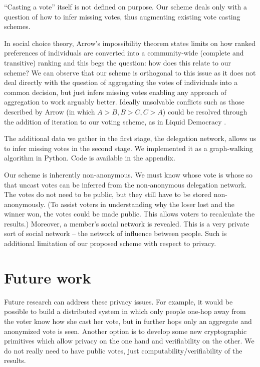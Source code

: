 \documentclass[a4paper]{acm_proc_article-sp}
\begin{document}
``Casting a vote'' itself is not defined on purpose.  Our scheme deals only with a question of how to infer missing votes, thus augmenting
existing vote casting schemes.

In social choice theory, Arrow's impossibility theorem\cite{arrow} states limits on how ranked preferences of individuals are
converted into a community-wide (complete and transitive) ranking and this begs the question: how does this relate to our
scheme? We can observe that our scheme is orthogonal to this issue as it does not deal directly with the question of aggregating
the votes of individuals into a common decision, but just infers missing votes enabling any approach of aggregation to work
arguably better.  Ideally unsolvable conflicts such as those described by Arrow (in which $A > B, B > C, C > A$) could be resolved through the addition of iteration to our voting scheme, as in Liquid Democracy \cite{liquiddem}.

The additional data we gather in the first stage, the delegation network, allows us to infer missing votes in the second stage.
We implemented it as a graph-walking algorithm in Python. Code is available in the appendix.

Our scheme is inherently non-anonymous. We must know whose vote is whose so that uncast votes
can be inferred from the non-anonymous delegation network. The votes do not need to be public, but they still have to be stored non-anonymously.  (To assist voters in understanding why the loser lost and the winner won, the votes could be made public.  This allows voters to recalculate the results.) Moreover, a member's social network is revealed. This is a very private sort of
social network -- the network of influence between people. Such is additional limitation of our proposed scheme with respect to privacy.

\section{Future work}

Future research can address these privacy issues. For example, it would be possible to build a distributed system in which only people
one-hop away from the voter know how she cast her vote, but in further hops only an aggregate and anonymized vote is seen. Another
option is to develop some new cryptographic primitives which allow privacy on the one hand and verifiability on the other.
We do not really need to have public votes, just computability/verifiability of the results.
\end{document}
